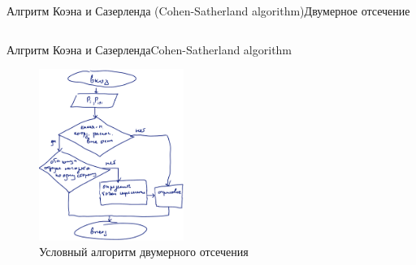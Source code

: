 \documentclass{beamer}
\begin{document}
\begin{frame}{Алгритм Коэна и Сазерленда (Cohen-Satherland algorithm)}{Двумерное отсечение}
{\begin{columns}
\begin{column}{0.5\textwidth}
				\end{column}
			\end{columns}
		}

	\end{frame}

	
	\begin{frame}{Алгритм Коэна и Сазерленда}{Cohen-Satherland algorithm}


		\begin{figure} 
			\includegraphics[width=0.42\textwidth]{images/scheme_2d.png}
			\caption{Условный алгоритм двумерного отсечения}
		\end{figure}

		\note{

		}

	\end{frame}
\end{document}
